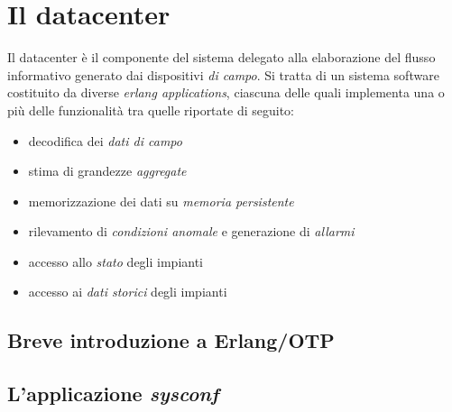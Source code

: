 \clearpage{\pagestyle{empty}\cleardoublepage}
\chapter{Il datacenter}\label{sec:datacenter}
Il datacenter \`e il componente del sistema delegato alla elaborazione 
del flusso informativo generato dai dispositivi \emph{di campo}.
%
Si tratta di un sistema software costituito da diverse \emph{erlang 
applications}\cite{erlapplication}, ciascuna delle quali implementa 
una o pi\`u delle funzionalit\`a tra quelle riportate di seguito:
%
\begin{itemize}
  \item decodifica dei \emph{dati di campo}
  \item stima di grandezze \emph{aggregate}
  \item memorizzazione dei dati su \emph{memoria persistente}
  \item rilevamento di \emph{condizioni anomale} e generazione di \emph{allarmi}
  \item accesso allo \emph{stato} degli impianti
  \item accesso ai \emph{dati storici} degli impianti
\end{itemize}
%



\section{Breve introduzione a Erlang/OTP}



\section{L'applicazione \emph{sysconf}}
